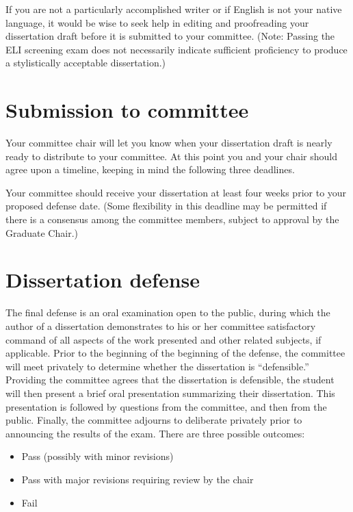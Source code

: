 \documentclass[
]{book}
\providecommand{\tightlist}{%
  \setlength{\itemsep}{0pt}\setlength{\parskip}{0pt}}
\begin{document}
If you are not a particularly accomplished writer or if English is not your native language, it would be wise to seek help in editing and proofreading your dissertation draft before it is submitted to your committee. (Note: Passing the ELI screening exam does not necessarily indicate sufficient proficiency to produce a stylistically acceptable dissertation.)

\section{Submission to committee}\label{submission-to-committee}

Your committee chair will let you know when your dissertation draft is nearly ready to distribute to your committee. At this point you and your chair should agree upon a timeline, keeping in mind the following three deadlines.

Your committee should receive your dissertation at least four weeks prior to your proposed defense date. (Some flexibility in this deadline may be permitted if there is a consensus among the committee members, subject to approval by the Graduate Chair.)

\section{Dissertation defense}\label{dissertation-defense}

The final defense is an oral examination open to the public, during which the author of a dissertation demonstrates to his or her committee satisfactory command of all aspects of the work presented and other related subjects, if applicable. Prior to the beginning of the beginning of the defense, the committee will meet privately to determine whether the dissertation is ``defensible.'' Providing the committee agrees that the dissertation is defensible, the student will then present a brief oral presentation summarizing their dissertation. This presentation is followed by questions from the committee, and then from the public. Finally, the committee adjourns to deliberate privately prior to announcing the results of the exam. There are three possible outcomes:

\begin{itemize}
\tightlist
\item
  Pass (possibly with minor revisions)
\item
  Pass with major revisions requiring review by the chair
\item
  Fail
\end{itemize}
\end{document}
